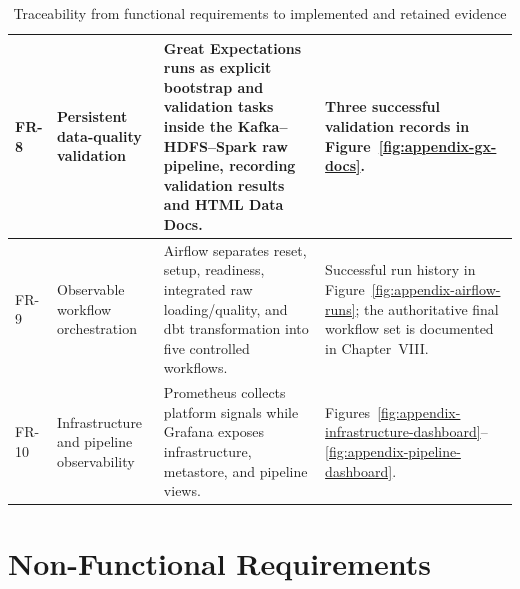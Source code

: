 \begin{table}[H]
\begin{tabularx}{\textwidth}{|L{1.0cm}|L{3.7cm}|Y|L{3.6cm}|}
        \hline
        FR-8 & Persistent data-quality validation & Great Expectations runs as explicit bootstrap and validation tasks inside the Kafka--HDFS--Spark raw pipeline, recording validation results and HTML Data Docs. & Three successful validation records in Figure~\ref{fig:appendix-gx-docs}. \\
        \hline
        FR-9 & Observable workflow orchestration & Airflow separates reset, setup, readiness, integrated raw loading/quality, and dbt transformation into five controlled workflows. & Successful run history in Figure~\ref{fig:appendix-airflow-runs}; the authoritative final workflow set is documented in Chapter~VIII. \\
        \hline
        FR-10 & Infrastructure and pipeline observability & Prometheus collects platform signals while Grafana exposes infrastructure, metastore, and pipeline views. & Figures~\ref{fig:appendix-infrastructure-dashboard}--\ref{fig:appendix-pipeline-dashboard}. \\
        \hline
    \end{tabularx}
    \caption{Traceability from functional requirements to implemented and retained evidence}
    \label{tab:appendix-functional-traceability}
\end{table}
\FloatBarrier

\section{Non-Functional Requirements}

